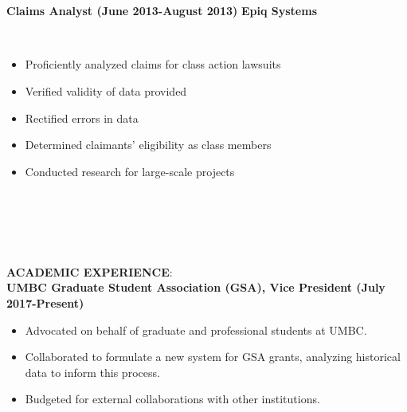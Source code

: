 \documentclass{article}
\begin{document}
\phantom \\
\phantom \\
%
%
%
%
\begin{vwcol}[widths={0.8,0.2}, sep=.8cm, justify=flush, rule=0pt, indent=0em]
\noindent \textbf{Claims Analyst (June 2013-August 2013)}
\newpage
\noindent \textbf{Epiq Systems}
\end{vwcol}
\phantom \\
\begin{itemize}
\item Proficiently analyzed claims for class action lawsuits
\item Verified validity of data provided
\item Rectified errors in data
\item Determined claimants' eligibility as class members
\item Conducted research for large-scale projects
\end{itemize}
\phantom \\
\phantom \\
%
%
%
%
\par
\phantom \\
\phantom \\
\noindent \textbf{ACADEMIC EXPERIENCE}:\\
\noindent \textbf{UMBC Graduate Student Association (GSA), Vice President (July 2017-Present)}
\phantom \\
\begin{itemize}
\item Advocated on behalf of graduate and professional students at UMBC.
\item Collaborated to formulate a new system for GSA grants, analyzing historical data to inform this process.
\item Budgeted for external collaborations with other institutions.
\end{itemize}
\phantom \\
\end{document}
